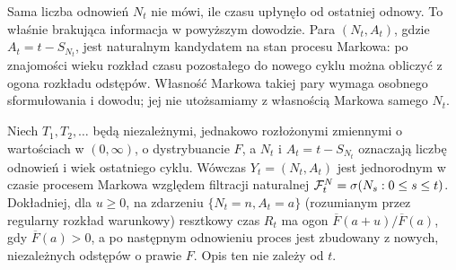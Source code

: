 \begin{uwaga}
Sama liczba odnowień $N_t$ nie mówi, ile czasu upłynęło
od ostatniej odnowy. To właśnie brakująca informacja w
powyższym dowodzie. Para $(N_t,A_t)$, gdzie
$A_t=t-S_{N_t}$, jest naturalnym kandydatem na stan
procesu Markowa: po znajomości wieku rozkład czasu
pozostałego do nowego cyklu można obliczyć z ogona
rozkładu odstępów. Własność Markowa takiej pary
wymaga osobnego sformułowania i dowodu; jej nie
utożsamiamy z własnością Markowa samego $N_t$.
\end{uwaga}


\begin{twierdzenie}
\label{thm:wiek-markow}
Niech $T_1,T_2,\ldots$ będą niezależnymi, jednakowo rozłożonymi
zmiennymi o wartościach w $(0,\infty)$, o dystrybuancie $F$,
a $N_t$ i $A_t=t-S_{N_t}$ oznaczają liczbę odnowień i wiek
ostatniego cyklu. Wówczas $Y_t=(N_t,A_t)$ jest jednorodnym
w czasie procesem Markowa względem filtracji naturalnej
$\mathcal{F}_t^N=\sigma(N_s:0\le s\le t)$.
Dokładniej, dla $u\ge0$, na zdarzeniu $\{N_t=n,A_t=a\}$
(rozumianym przez regularny rozkład warunkowy) resztkowy czas
$R_t$ ma ogon
$\overline F(a+u)/\overline F(a)$, gdy $\overline F(a)>0$,
a po następnym odnowieniu proces jest zbudowany z nowych,
niezależnych odstępów o prawie $F$. Opis ten nie zależy od $t$.
\end{twierdzenie}
